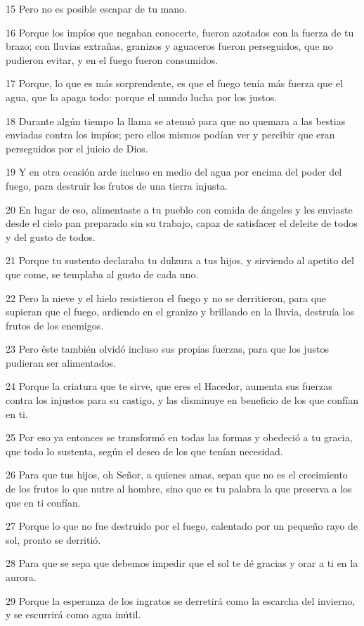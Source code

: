 \par 15 Pero no es posible escapar de tu mano.
\par 16 Porque los impíos que negaban conocerte, fueron azotados con la fuerza de tu brazo; con lluvias extrañas, granizos y aguaceros fueron perseguidos, que no pudieron evitar, y en el fuego fueron consumidos.
\par 17 Porque, lo que es más sorprendente, es que el fuego tenía más fuerza que el agua, que lo apaga todo: porque el mundo lucha por los justos.
\par 18 Durante algún tiempo la llama se atenuó para que no quemara a las bestias enviadas contra los impíos; pero ellos mismos podían ver y percibir que eran perseguidos por el juicio de Dios.
\par 19 Y en otra ocasión arde incluso en medio del agua por encima del poder del fuego, para destruir los frutos de una tierra injusta.
\par 20 En lugar de eso, alimentaste a tu pueblo con comida de ángeles y les enviaste desde el cielo pan preparado sin su trabajo, capaz de satisfacer el deleite de todos y del gusto de todos.
\par 21 Porque tu sustento declaraba tu dulzura a tus hijos, y sirviendo al apetito del que come, se templaba al gusto de cada uno.
\par 22 Pero la nieve y el hielo resistieron el fuego y no se derritieron, para que supieran que el fuego, ardiendo en el granizo y brillando en la lluvia, destruía los frutos de los enemigos.
\par 23 Pero éste también olvidó incluso sus propias fuerzas, para que los justos pudieran ser alimentados.
\par 24 Porque la criatura que te sirve, que eres el Hacedor, aumenta sus fuerzas contra los injustos para su castigo, y las disminuye en beneficio de los que confían en ti.
\par 25 Por eso ya entonces se transformó en todas las formas y obedeció a tu gracia, que todo lo sustenta, según el deseo de los que tenían necesidad.
\par 26 Para que tus hijos, oh Señor, a quienes amas, sepan que no es el crecimiento de los frutos lo que nutre al hombre, sino que es tu palabra la que preserva a los que en ti confían.
\par 27 Porque lo que no fue destruido por el fuego, calentado por un pequeño rayo de sol, pronto se derritió.
\par 28 Para que se sepa que debemos impedir que el sol te dé gracias y orar a ti en la aurora.
\par 29 Porque la esperanza de los ingratos se derretirá como la escarcha del invierno, y se escurrirá como agua inútil.

